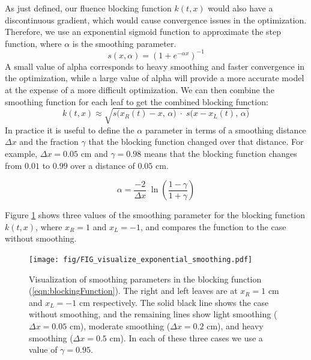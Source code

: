 \documentclass{iopart}
\begin{document}
As just defined, our fluence blocking function $k(t,x)$
would also have a discontinuous gradient, which would cause convergence issues in the optimization.
Therefore, we use an exponential sigmoid function 
to approximate the step function, where $\alpha$ is the smoothing parameter. 
\begin{equation}
  s(x, \alpha) = (1 + e^{-\alpha x})^{-1}
  \label{eqn:sigmoidEquation}
\end{equation}
A small value of alpha corresponds to heavy smoothing and faster convergence in the optimization, while a large value of alpha will provide a more accurate model at the expense of a more difficult optimization.
We can then combine the smoothing function for each leaf to get the combined blocking function:
\begin{equation}
  k(t, x) \approx \sqrt{s\big(x_R(t) -x, \, \alpha\big) \; \cdot \; s\big(x -x_L(t), \, \alpha\big)}
  \label{eqn:blockingFunction}
\end{equation}
\noindent In practice it is useful to define the $\alpha$ parameter in terms of 
a smoothing distance $\Delta x$ and 
the fraction $\gamma$ that the blocking function changed over that distance.
For example, $\Delta x = 0.05$ cm and $\gamma = 0.98$ means that 
the blocking function changes from $0.01$ to $0.99$ over a distance of $0.05$ cm.


\begin{equation}
  \alpha = \frac{-2}{\Delta x} \; \ln \! \left( \frac{1 - \gamma}{1 + \gamma} \right)
  \label{eqn:SmoothingDistanceParameter}
\end{equation}

Figure \ref{fig:visualizeExponentialSmoothing} shows three values of the smoothing parameter for the blocking function $k(t, x)$, where $x_R = 1$ and $x_L = -1$, and compares the function to the case without smoothing.

\begin{figure}
  \centering
  \texttt{[image: fig/FIG\_visualize\_exponential\_smoothing.pdf]}
  \caption{Visualization of smoothing parameters in the blocking function (\ref{eqn:blockingFunction}). The right and left leaves are at $x_R = 1$ cm and $x_L = -1$ cm respectively. The solid black line shows the case without smoothing, and the remaining lines show light smoothing ($\Delta x = 0.05$ cm), moderate smoothing ($\Delta x = 0.2$ cm), and heavy smoothing ($\Delta x = 0.5$ cm). In each of these three cases we use a value of $\gamma = 0.95$.}
  \label{fig:visualizeExponentialSmoothing}
\end{figure}
\end{document}
